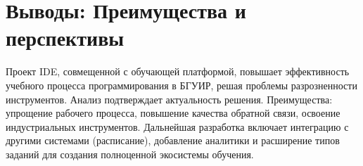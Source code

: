 \documentclass{bsuir}
\begin{document}
\section{Выводы: Преимущества и перспективы}

Проект IDE, совмещенной с обучающей платформой, повышает эффективность учебного
процесса программирования в БГУИР, решая проблемы разрозненности инструментов.
Анализ подтверждает актуальность решения. Преимущества: упрощение рабочего
процесса, повышение качества обратной связи, освоение индустриальных
инструментов. Дальнейшая разработка включает интеграцию с другими системами
(расписание), добавление аналитики и расширение типов заданий для создания
полноценной экосистемы обучения.
\end{document}
